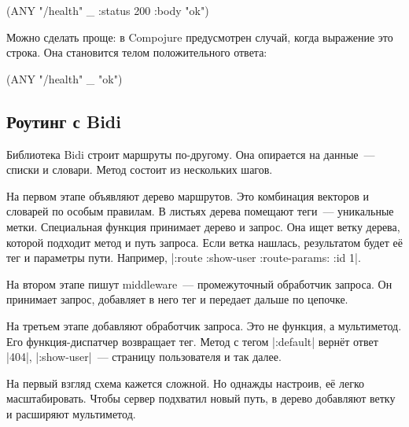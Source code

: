 
\begin{english}
  \begin{clojure}
(ANY "/health" _ {:status 200 :body "ok"})
  \end{clojure}
\end{english}

Можно сделать проще: в Compojure предусмотрен случай, когда выражение это
строка. Она становится телом положительного ответа:

\begin{english}
  \begin{clojure}
(ANY "/health" _ "ok")
  \end{clojure}
\end{english}

\subsection{Роутинг с Bidi}


Библиотека Bidi строит маршруты
по-другому. Она опирается на данные~--- списки и словари. Метод состоит из
нескольких шагов.

На первом этапе объявляют дерево маршрутов. Это комбинация векторов и словарей
по особым правилам. В листьях дерева помещают теги~--- уникальные
метки. Специальная функция принимает дерево и запрос. Она ищет ветку дерева,
которой подходит метод и путь запроса. Если ветка нашлась, результатом будет
е\"{е} тег и параметры пути. Например, \spverb|{:route :show-user :route-params: {:id 1}}|.


На втором этапе пишут middleware~--- промежуточный обработчик запроса. Он
принимает запрос, добавляет в него тег и передает дальше по цепочке.

На третьем этапе добавляют обработчик запроса. Это не функция, а мультиметод.
Его функция-диспатчер возвращает тег. Метод с тегом \spverb|:default| верн\"{е}т
ответ \spverb|404|, \spverb|:show-user|~--- страницу пользователя и так далее.

На первый взгляд схема кажется сложной. Но однажды настроив, е\"{е} легко
масштабировать. Чтобы сервер подхватил новый путь, в дерево добавляют ветку и
расширяют мультиметод.


